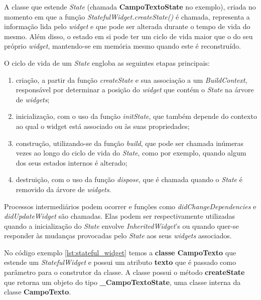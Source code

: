 A classe que estende \textit{State} (chamada \textbf{CampoTextoState} no exemplo), criada no momento em que a função \textit{StatefulWidget.createState()} é chamada, representa a informação lida pelo \textit{widget} e que pode ser alterada durante o tempo de vida do mesmo.
Além disso, o estado em si pode ter um ciclo de vida maior que o do seu próprio \textit{widget}, mantendo-se em memória mesmo quando este é reconstruído.

O ciclo de vida de um \textit{State} engloba as seguintes etapas principais:

\begin{enumerate}
  \item criação, a partir da função \textit{createState} e sua associação a um \textit{BuildContext}, responsável por determinar a posição do \textit{widget} que contém o \textit{State} na árvore de \textit{widgets};
  \item inicialização, com o uso da função \textit{initState}, que também depende do contexto ao qual o widget está associado ou às suas propriedades;
  \item construção, utilizando-se da função \textit{build}, que pode ser chamada inúmeras vezes ao longo do ciclo de vida do \textit{State}, como por exemplo, quando algum dos seus estados internos é alterado;
  \item destruição, com o uso da função \textit{dispose}, que é chamada quando o \textit{State} é removido da árvore de \textit{widgets}.
\end{enumerate}

Processos intermediários podem ocorrer e funções como \textit{didChangeDependencies} e \textit{didUpdateWidget} são chamadas. Elas podem ser respectivamente utilizadas quando a inicialização do \textit{State} envolve \textit{InheritedWidget}'s ou quando quer-se responder às mudanças provocadas pelo \textit{State} aos seus \textit{widgets} associados.

No código exemplo \ref{lst:stateful_widget} temos a \textbf{classe CampoTexto} que estende um \textit{StatefulWidget} e possui um atributo \textbf{texto} que é passado como parâmetro para o construtor da classe. A classe possui o método \textbf{createState} que retorna um objeto do tipo \textbf{\_CampoTextoState}, uma classe interna da classe \textbf{CampoTexto}.

